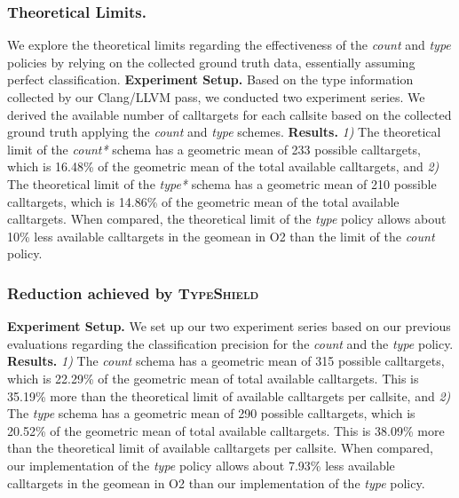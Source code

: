 \subsubsection{Theoretical Limits.}
\label{subsection:theoreticallimit}
We explore the theoretical limits regarding the effectiveness of the \textit{count} and \textit{type} policies by relying on the collected ground truth data, essentially assuming perfect classification.
\textbf{Experiment Setup.} Based on the type information collected by our Clang/LLVM pass, we conducted two experiment series.
We derived the available number of calltargets for each callsite based on the collected ground truth applying the \textit{count} and \textit{type} schemes.
\textbf{Results.}
\textit{1)} The theoretical limit of the \textit{count*} schema has a geometric mean of 233 possible calltargets, which is 16.48\% of the geometric mean of the total available calltargets, and
\textit{2)} The theoretical limit of the \textit{type*} schema has a geometric mean of 210 possible calltargets, which is 14.86\% of the geometric mean of the total available calltargets.
When compared, the theoretical limit of the \textit{type} policy allows about 10\% less available calltargets in the geomean in O2 than the limit of the \textit{count} policy.

\subsubsection{Reduction achieved by \textsc{TypeShield}}
\label{subsection:typeshieldvslimitcount}
\textbf{Experiment Setup.} We set up our two experiment series based on our previous evaluations regarding the classification precision for the \textit{count} and the \textit{type} policy.
\textbf{Results.}
\textit{1)}  The \textit{count} schema has a geometric mean of 315 possible calltargets, which is 22.29\% of the geometric mean of total available calltargets. This is 35.19\% more than the theoretical limit of available calltargets per callsite, and
\textit{2)}  The \textit{type} schema has a geometric mean of 290 possible calltargets, which is 20.52\% of the geometric mean of total available calltargets. This is 38.09\% more than the theoretical limit of available calltargets per callsite.
When compared, our implementation of the \textit{type} policy allows about 7.93\% less available calltargets in the geomean in O2 than our implementation of the \textit{type} policy.


